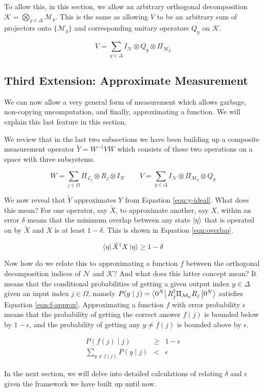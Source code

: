 To allow this, in this section, we allow an arbitrary orthogonal decomposition
$\mathcal{K} = \bigotimes_{y \in \Delta} \mathcal{M}_y$. This is the same as
allowing $V$ to be an arbitrary sum of projectors onto $\{\mathcal{M}_y\}$
and corresponding unitary operators $Q_y$ on $\mathcal{K}$.

\begin{equation}
V = \sum_{y \in \Delta} I_{\mathcal{N}} \otimes Q_y \otimes \Pi_{\mathcal{M}_y}
\end{equation}

\subsection{Third Extension: Approximate Measurement}
\label{subsec:approx}

We can now allow a very general form of
measurement which allows garbage, non-copying uncomputation, and finally,
approximating a function. We will explain this last feature in this section.

We review that in the last two subsections we have been building up a
composite measurement operator $\tilde{Y} = W^{-1}VW$ which consists of 
these two operations on a space with three subsystems.

\begin{equation}
W = \sum_{j \in \Omega} \Pi_{\mathcal{L}_j} \otimes R_j \otimes I_{\mathcal{K}} \qquad
V = \sum_{y \in \Delta} I_{\mathcal{N}} \otimes \Pi_{\mathcal{M}_y} \otimes Q_y
\end{equation}

We now reveal that $\tilde{Y}$ approximates $Y$ from Equation \ref{eqn:y-ideal}.
What does this mean? For one operator, say $\tilde{X}$, to approximate another,
say $X$, within an error $\delta$ means that the minimum overlap between
any state $\left\vert{\eta}\right\rangle$ that is operated on by $\tilde{X}$ and $X$ is at least
$1 - \delta$. This is shown in Equation \ref{eqn:overlap}.

\begin{equation}
\left\langle{\eta}\right\vert \tilde{X}^{\dagger} X \left\vert{\eta}\right\rangle \ge 1 - \delta
\label{eqn:overlap}
\end{equation}

Now how do we relate this to approximating a function
$f$ between the orthogonal decomposition indices of $\mathcal{N}$ and 
$\mathcal{K}$? And what does this latter concept mean?
It means that the conditional probabilities of
getting a given output index $y \in \Delta$ given an input index $j \in \Omega$,
namely $P(y \mid j) = \left\langle{0^N}\right\vert R^{\dagger}_j \Pi_{\mathcal{M}_y} R_j \left\vert{0^N}\right\rangle$
satisfies Equation \ref{eqn:f-approx}. Approximating a function $f$ with
error probability $\epsilon$ means that the probability of getting the
correct answer $f(j)$ is bounded below by $1 - \epsilon$, and the probability
of getting any $y \ne f(j)$ is bounded above by $\epsilon$.

\begin{eqnarray}
P(f(j) \mid j) & \ge & 1 - \epsilon \\
\sum_{y \ne f(j)} P(y \mid j) & < & \epsilon
\label{eqn:f-approx}
\end{eqnarray}

In the next section, we will delve into detailed calculations of relating
$\delta$ and $\epsilon$ given the framework we have built up until now.
